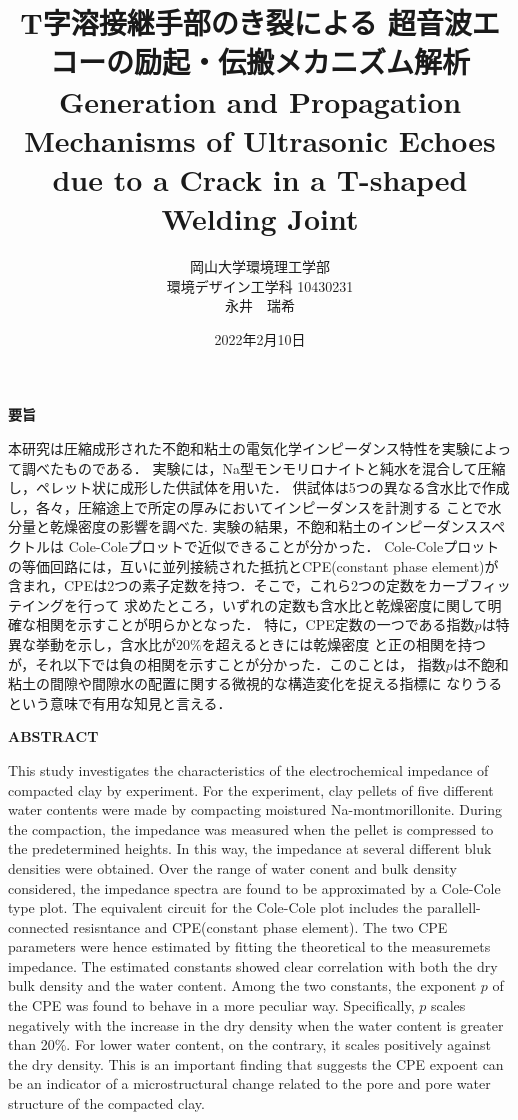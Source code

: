 ﻿\documentclass[11pt,a4j]{mybook2}
\title{
\vspace{20mm}
T字溶接継手部のき裂による
超音波エコーの励起・伝搬メカニズム解析
\\
\vspace{5mm}
Generation and Propagation Mechanisms of Ultrasonic Echoes \\
due to a Crack in a T-shaped Welding Joint
\vspace{60mm}
}
\date{2022年2月10日}
\author{
	\vspace{40mm}
岡山大学環境理工学部\\
環境デザイン工学科 10430231\\
	永井　瑞希
}
\begin{document}
\maketitle
\begin{center}
\begin{minipage}{15cm}
\begin{center}
	{\bf 要旨}
\end{center}
本研究は圧縮成形された不飽和粘土の電気化学インピーダンス特性を実験によって調べたものである．
実験には，Na型モンモリロナイトと純水を混合して圧縮し，ペレット状に成形した供試体を用いた．
供試体は5つの異なる含水比で作成し，各々，圧縮途上で所定の厚みにおいてインピーダンスを計測する
ことで水分量と乾燥密度の影響を調べた. 実験の結果，不飽和粘土のインピーダンススペクトルは
Cole-Coleプロットで近似できることが分かった．
Cole-Coleプロットの等価回路には，互いに並列接続された抵抗とCPE(constant phase element)が
含まれ，CPEは2つの素子定数を持つ．そこで，これら2つの定数をカーブフィッテイングを行って
求めたところ，いずれの定数も含水比と乾燥密度に関して明確な相関を示すことが明らかとなった．
特に，CPE定数の一つである指数$p$は特異な挙動を示し，含水比が$20\%$を超えるときには乾燥密度
と正の相関を持つが，それ以下では負の相関を示すことが分かった．このことは，
指数$p$は不飽和粘土の間隙や間隙水の配置に関する微視的な構造変化を捉える指標に
なりうるという意味で有用な知見と言える．
	\vspace{15mm}
\begin{center}
	{\bf ABSTRACT}
\end{center}
This study investigates the characteristics of the electrochemical impedance of compacted clay by experiment.
For the experiment, clay pellets of five different water contents were made by compacting moistured Na-montmorillonite.
During the compaction, the impedance was measured when the pellet is compressed to the predetermined heights. 
In this way, the impedance at several different bluk densities were obtained.
Over the range of water conent and bulk density considered,  the impedance spectra are found to be 
approximated by a Cole-Cole type plot. The equivalent circuit for the Cole-Cole plot includes the parallell-connected 
resisntance and CPE(constant phase element). The two CPE parameters were hence estimated by fitting the theoretical 
to the measuremets impedance. The estimated constants showed clear correlation with both the dry bulk density 
and the water content. Among the two constants, the exponent $p$ of the CPE was found to behave in a more peculiar way. 
Specifically, $p$ scales negatively with the increase in the dry density when the water content is greater than 20\%. 
For lower water content, on the contrary, it scales positively against the dry density. 
This is an important finding that suggests the CPE expoent can be an indicator of a microstructural change 
related to the pore and pore water structure of the compacted clay.
\end{minipage}
\end{center}
\end{document}
